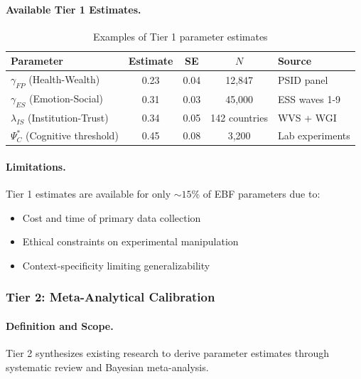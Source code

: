 \paragraph{Available Tier 1 Estimates.}

\begin{table}[h]
\centering
\small
\begin{tabular}{lcccl}
\toprule
\textbf{Parameter} & \textbf{Estimate} & \textbf{SE} & \textbf{$N$} & \textbf{Source} \\
\midrule
$\gamma_{FP}$ (Health-Wealth) & 0.23 & 0.04 & 12,847 & PSID panel \\
$\gamma_{ES}$ (Emotion-Social) & 0.31 & 0.03 & 45,000 & ESS waves 1-9 \\
$\lambda_{IS}$ (Institution-Trust) & 0.34 & 0.05 & 142 countries & WVS + WGI \\
$\Psi^*_C$ (Cognitive threshold) & 0.45 & 0.08 & 3,200 & Lab experiments \\
\bottomrule
\end{tabular}
\caption{Examples of Tier 1 parameter estimates}
\label{tab:tier1-examples}
\end{table}

\paragraph{Limitations.}

Tier 1 estimates are available for only $\sim 15\%$ of EBF parameters due to:
\begin{itemize}
    \item Cost and time of primary data collection
    \item Ethical constraints on experimental manipulation
    \item Context-specificity limiting generalizability
\end{itemize}

\subsubsection{Tier 2: Meta-Analytical Calibration}

\paragraph{Definition and Scope.}

Tier 2 synthesizes existing research to derive parameter estimates through 
systematic review and Bayesian meta-analysis.

